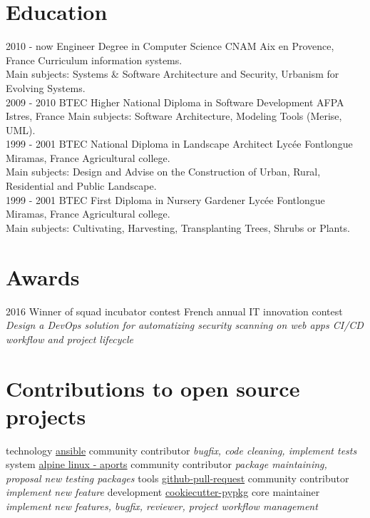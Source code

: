 \documentclass[]{friggeri-cv}
\begin{document}
\section{Education}
\begin{entrylist}
    \entry
        {2010 - now}
        {Engineer Degree in Computer Science}
        {CNAM Aix en Provence, France}
        {Curriculum information systems.\\
        Main subjects: Systems \& Software Architecture and Security,
        Urbanism for Evolving Systems.\\}
    \entry
        {2009 - 2010}
        {BTEC Higher National Diploma in Software Development}
        {AFPA Istres, France}
        {Main subjects: Software Architecture, Modeling Tools (Merise, UML).\\}
    \entry
        {1999 - 2001}
        {BTEC National Diploma in Landscape Architect}
        {Lycée Fontlongue Miramas, France}
        {Agricultural college.\\
        Main subjects: Design and Advise on the Construction of Urban, Rural, 
        Residential and Public Landscape.\\}
    \entry
        {1999 - 2001}
        {BTEC First Diploma in Nursery Gardener}
        {Lycée Fontlongue Miramas, France}
        {Agricultural college.\\
        Main subjects: Cultivating, Harvesting, Transplanting Trees, Shrubs or Plants.}
\end{entrylist}

\section{Awards}
\begin{entrylist}
    \entry
        {2016}
        {Winner of squad incubator contest}
        {French annual IT innovation contest}
        {\emph{Design a DevOps solution for automatizing security scanning on web apps CI/CD workflow and project lifecycle}}
\end{entrylist}

\section{Contributions to open source projects}
\begin{entrylist}
    \entry
        {technology}
        {\href{https://github.com/ansible/ansible}{ansible}}
        {community contributor}
        {\emph{bugfix, code cleaning, implement tests}}
    \entry
        {system}
        {\href{https://github.com/alpinelinux/aports}{alpine linux - aports}}
        {community contributor}
        {\emph{package maintaining, proposal new testing packages}}
    \entry
        {tools}
        {\href{https://github.com/jd/git-pull-request}{github-pull-request}}
        {community contributor}
        {\emph{implement new feature}}
    \entry
        {development}
        {\href{https://github.com/AntoineCezar/cookiecutter-pypkg}{cookiecutter-pypkg}}
        {core maintainer}
        {\emph{implement new features, bugfix, reviewer, project workflow management}}
\end{entrylist}
\end{document}
